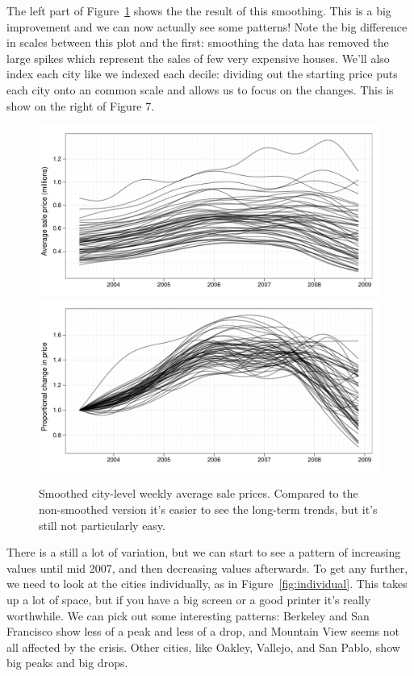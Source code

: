 \documentclass[oneside]{article}
\begin{document}
The left part of Figure~\ref{fig:smoothed} shows the the result of this smoothing. This is a big improvement and we can now actually see some patterns! Note the big difference in scales between this plot and the first: smoothing the data has removed the large spikes which represent the sales of few very expensive houses. We'll also index each city like we indexed each decile: dividing out the starting price puts each city onto an common scale and allows us to focus on the changes.  This is show on the right of Figure 7.  

\begin{figure}[htbp]
  \centering
  \includegraphics[width=0.5 \linewidth]{cities-smooth}%
  \includegraphics[width=0.5 \linewidth]{cities-indexed}
  \caption{Smoothed city-level weekly average sale prices.  Compared to the non-smoothed version it's easier to see the long-term trends, but it's still not particularly easy.}
  \label{fig:smoothed}
\end{figure}

There is a still a lot of variation, but we can start to see a pattern of increasing values until mid 2007, and then decreasing values afterwards.  To get any further, we need to look at the cities individually, as in Figure~\ref{fig:individual}.  This takes up a lot of space, but if you have a big screen or a good printer it's really worthwhile.  We can pick out some interesting patterns: Berkeley and San Francisco show less of a peak and less of a drop, and Mountain View seems not all affected by the crisis.  Other cities, like Oakley, Vallejo, and San Pablo, show big peaks and big drops.
\end{document}

